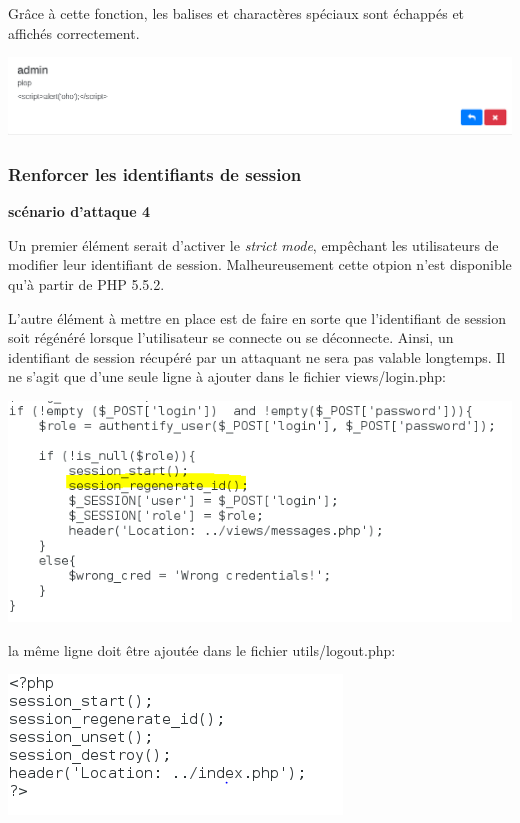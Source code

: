 \documentclass{article}
\begin{document}
Grâce à cette fonction, les balises et charactères spéciaux sont
échappés et affichés correctement.

\includegraphics{images/xss_impl1.png}

\subsubsection{Renforcer les identifiants de session}

\textbf{scénario d'attaque 4}

Un premier élément serait d'activer le \emph{strict mode}, empêchant les
utilisateurs de modifier leur identifiant de session. Malheureusement
cette otpion n'est disponible qu'à partir de PHP 5.5.2.

L'autre élément à mettre en place est de faire en sorte que
l'identifiant de session soit régénéré lorsque l'utilisateur se connecte
ou se déconnecte. Ainsi, un identifiant de session récupéré par un
attaquant ne sera pas valable longtemps. Il ne s'agit que d'une seule
ligne à ajouter dans le fichier views/login.php:

\includegraphics{images/session_code.PNG}

la même ligne doit être ajoutée dans le fichier utils/logout.php:

\includegraphics{images/session_logout.PNG}
\end{document}
